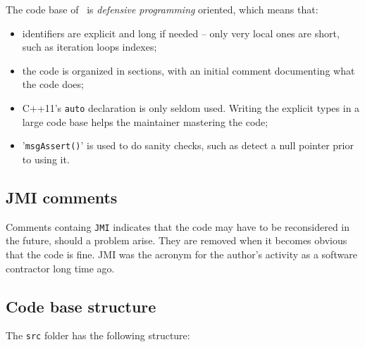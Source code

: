 The code base of \xmlToLy\ is {\it defensive programming} oriented, which means that:
\begin{itemize}
\item identifiers are explicit and long if needed -- only very local ones are short, such as iteration loops indexes;

\item the code is organized in sections, with an initial comment documenting what the code does;

\item C++11's {\tt auto} declaration is only seldom used. Writing the explicit types in a large code base helps the maintainer mastering the code;

\item '{\tt msgAssert()}' is used to do sanity checks, such as detect a null pointer prior to using it.
\end{itemize}


\subsection{JMI comments}

Comments containg {\tt JMI} indicates that the code may have to be reconsidered in the future, should a problem arise. They are removed when it becomes obvious that the code is fine. JMI was the acronym for the author's activity as a software contractor long time ago.


\subsection{Code base structure}

The {\tt src} folder has the following structure:

